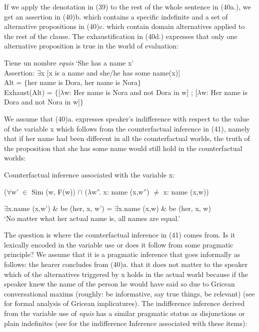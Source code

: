 \documentclass[output=paper]{langsci/langscibook}
\begin{document}
If we apply the denotation in (39) to the rest of the whole sentence in (40a.), we get an assertion in (40)b. which contains a specific indefinite and a set of alternative propositions in (40)c. which contain domain alternatives applied to the rest of the clause. The exhaustification in (40d.) expresses that only one alternative proposition is true in the world of evaluation:

\ea
\begin{xlist}
\ex Tiene un nombre \textit{equis}  ‘She has a name x’\\
\ex Assertion: $\exists$x [x is a name and she/he has some name(x)]\\
\ex Alt = $\lbrace$her name is Dora, her name is Nora$\rbrace$\\
\ex Exhaust(Alt) = $\lbrace${[}$\lambda$w: Her name is Nora and not Dora in w{]} ; {[}$\lambda$w: Her name is Dora and not Nora in w{]}$\rbrace$\\
\end{xlist}
\z

We assume that (40)a. expresses speaker's indifference with respect to the value of the variable x which follows from the counterfactual inference in (41), namely that if her name had been different in all the counterfactual worlds, the truth of the proposition that she has some name would still hold in the counterfactual worlds:

\ea
Counterfactual inference associated with the variable x:\par
($\forall$w’ $\in$ Sim (w, F(w)) $\cap$ ($\lambda$w”. x: name (x,w”) $≠$ x: name (x,w)) \par
$\exists$x.name (x,w’) \& be (her, x, w’) = $\exists$x.name (x,w) \& be (her, x, w)\\
\glt ‘No matter what her actual name is, all names are equal.’
\z

The question is where the counterfactual inference in (41) comes from. Is it lexically encoded in the variable use or does it follow from some pragmatic principle? We assume that it is a pragmatic inference that goes informally as follows: the hearer concludes from (40)a. that it does not matter to the speaker which of the alternatives triggered by x holds in the actual world because if the speaker knew the name of the person he would have said so due to Gricean conversational maxims (roughly: be informative, say true things, be relevant) (see \citealt{Aloni2005} for formal analysis of Gricean implicatures). The indifference inference derived from the variable use of \textit{equis} has a similar pragmatic status as disjunctions or plain indefinites (see \citealt{Aloni2005} for the indifference Inference associated with these items):
\end{document}
